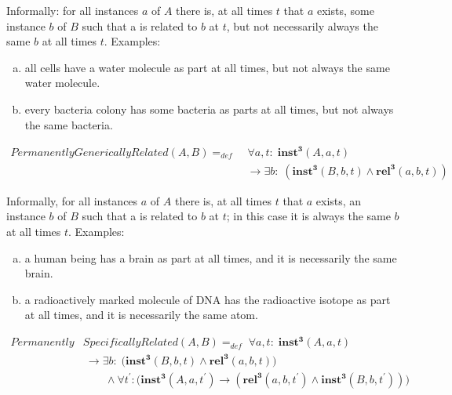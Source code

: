 \documentclass[10pt]{bmc_article}
\newcommand{\mirel}[1]{\ensuremath{\mathrm{\mathbf{#1}}}}
\newcommand{\mclass}[1]{\ensuremath{\mathit{#1}}}
\newcommand{\mrel}[2]{\mirel{#1^#2}}
\newcommand{\mrelt}[1]{\mrel{#1}{3}}
\newenvironment{bmcformat}{\baselineskip20pt\sloppy\setboolean{publ}{false}}{\baselineskip20pt\sloppy}
\begin{document}
\begin{bmcformat}
Informally: for all instances $a$ of \mclass{A} there is, at all times $t$ that
$a$ exists,
some instance $b$ of \mclass{B} such that a is related to $b$ at $t$, but not necessarily
always the same $b$ at all times $t$. Examples:
\begin{enumerate}[(a)]
\item all cells have a water molecule as
part at all times, but not always the same water molecule.
\item every bacteria colony has some bacteria as parts at all times, but not
always the same bacteria.
\end{enumerate}


\begin{equation}
\begin{split}
\mclass{PermanentlyGenericallyRelated}(\mclass{A},\mclass{B}) =_{def}&\;
\forall a, t:\; \mrelt{inst}(\mclass{A}, a, t) \\
&\ \rightarrow
\exists b:\;(\mrelt{inst}(\mclass{B},b,t) \wedge
\mrelt{rel}(a,b,t))
\end{split}
\label{eq:generically}
\end{equation}

Informally, for all instances $a$ of \mclass{A} there is, at all times $t$ that $a$ exists, an
instance $b$ of \mclass{B} such that a is related to $b$ at $t$; in this case it is always the
same $b$ at all times $t$. Examples:
\begin{enumerate}[(a)]
\item a human being has a brain as part at all times, and it is necessarily the same brain.
\item a radioactively marked molecule of DNA has the radioactive isotope as part
at all times, and it is necessarily the same atom.
\end{enumerate} 

\begin{equation}
\begin{split}
\mclass{Permanently}&\mclass{SpecificallyRelated}(\mclass{A},\mclass{B}) =_{def}\;
\forall a, t:\; \mrelt{inst}(\mclass{A}, a, t) \\
&\ \rightarrow 
\exists b:\;\big(\mrelt{inst}(\mclass{B},b,t) \wedge 
\mrelt{rel}(a,b,t))
\\
&\quad\quad \wedge \forall t^\prime: (\mrelt{inst}(\mclass{A},a,t^\prime)
\rightarrow (\mrelt{rel}(a,b,t^\prime) \wedge
\mrelt{inst}(\mclass{B},b,t^\prime))\big)
\end{split}
\label{eq:specifically}
\end{equation}



\end{bmcformat}
\end{document}
